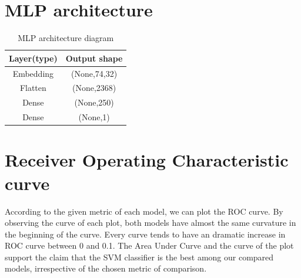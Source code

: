 \section{MLP architecture}
\begin{table}[!htb]
    \centering
    \begin{tabular}{|c|c|}
    \hline
    Layer(type)&Output shape  \\
    \hline\hline
    Embedding&(None,74,32)\\
    \hline
    Flatten&(None,2368)\\
    \hline
    Dense&(None,250)\\
    \hline
    Dense&(None,1)\\
    \hline
    \end{tabular}
    \caption{MLP architecture diagram}
    \label{tab:mlp_str}
\end{table}

\section{Receiver Operating Characteristic curve}
According to the given metric of each model, we can plot the ROC curve. By observing the curve of each plot, both models have almost the same curvature in the beginning of the curve. Every curve tends to have an dramatic increase in ROC curve between 0 and 0.1. The Area Under Curve and the curve of the plot 
support the claim that the SVM classifier is the best among our compared models, irrespective of the chosen metric of comparison.

